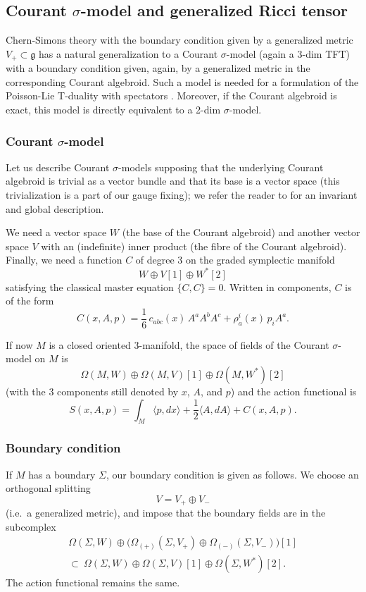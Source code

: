 \documentclass[a4paper]{amsart}
\theoremstyle{plain}
\theoremstyle{definition}
\newcommand{\g}{\mathfrak{g}}
\newcommand{\la}{\langle}
\newcommand{\ra}{\rangle}
\begin{document}
\subsection{Courant $\sigma$-model and generalized Ricci tensor} \label{Courantssec}
Chern-Simons theory with the boundary condition given by a generalized metric $V_+\subset\g$ has a natural generalization to a Courant $\sigma$-model (again a 3-dim TFT) with a boundary condition given, again, by a generalized metric in the corresponding Courant algebroid. Such a model is needed for a formulation of the Poisson-Lie T-duality with spectators \cite{S,PSV}. Moreover, if the Courant algebroid is exact, this model is directly equivalent to a 2-dim $\sigma$-model.

\subsubsection{Courant $\sigma$-model}
Let us describe Courant $\sigma$-models supposing that the underlying Courant algebroid is trivial as a vector bundle and that its base is a vector space (this trivialization is a part of our gauge fixing); we refer the reader to \cite{R} for an invariant and global description. 

We need a vector space $W$ (the base of the Courant algebroid) and another vector space $V$ with an (indefinite) inner product (the fibre of the Courant algebroid). Finally, we need a function $C$ of degree 3 on the graded symplectic manifold 
$$W\oplus V[1]\oplus W^*[2]$$
satisfying the classical master equation $\{C,C\}=0$. Written in components, $C$ is of the form
$$C(x,A,p)=\frac16\,c_{abc}(x)\,A^aA^bA^c + \rho^i_a(x)\,p_iA^a.$$

If now $M$ is a closed oriented 3-manifold, the space of fields of the Courant $\sigma$-model on $M$ is
$$\Omega(M,W)\oplus\Omega(M,V)[1]\oplus\Omega(M,W^*)[2]$$
(with the 3 components still denoted by $x$, $A$, and $p$)
and the action functional is
$$S(x,A,p)=\int_M\la p,dx\ra + \frac12 \la A,d A\ra + C(x,A,p).$$

\subsubsection{Boundary condition}
If $M$ has a boundary $\Sigma$, our boundary condition is given as follows. We choose an orthogonal splitting
$$V=V_+\oplus V_-$$
(i.e.\ a generalized metric), and impose that the boundary fields are in the subcomplex
\begin{multline*}
\Omega(\Sigma,W)\oplus\bigl(\Omega_{(+)}(\Sigma,V_+)\oplus\Omega_{(-)}(\Sigma,V_-)\bigr)[1]\\
\subset\ \Omega(\Sigma,W)\oplus\Omega(\Sigma,V)[1]\oplus\Omega(\Sigma,W^*)[2]. 
\end{multline*}
The action functional remains the same.
\end{document}
